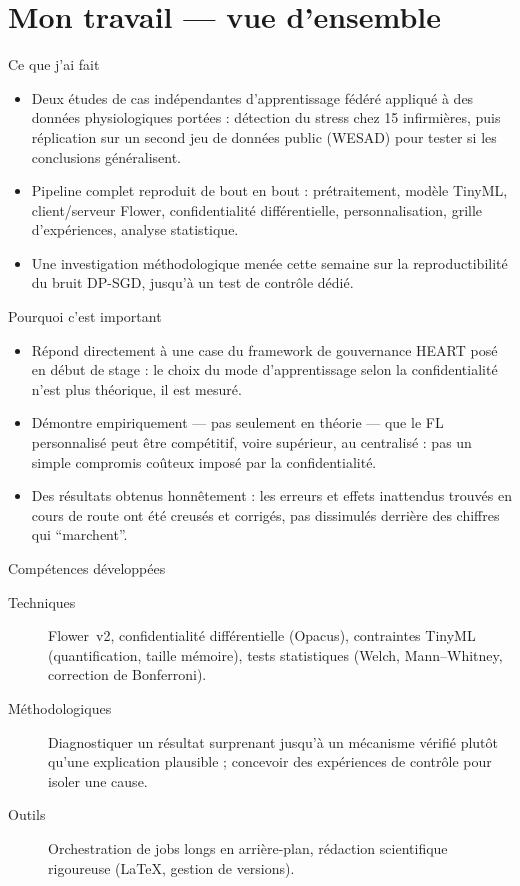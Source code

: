 \documentclass[aspectratio=169,11pt]{beamer}
\begin{document}
\section{Mon travail --- vue d'ensemble}

\begin{frame}{Ce que j'ai fait}
  \begin{itemize}
    \item Deux études de cas indépendantes d'apprentissage fédéré appliqué à
      des données physiologiques portées : détection du stress chez 15
      infirmières, puis réplication sur un second jeu de données public
      (WESAD) pour tester si les conclusions généralisent.
    \item Pipeline complet reproduit de bout en bout : prétraitement,
      modèle TinyML, client/serveur Flower, confidentialité différentielle,
      personnalisation, grille d'expériences, analyse statistique.
    \item Une investigation méthodologique menée cette semaine sur la
      reproductibilité du bruit DP-SGD, jusqu'à un test de contrôle dédié.
  \end{itemize}
\end{frame}

\begin{frame}{Pourquoi c'est important}
  \begin{itemize}
    \item Répond directement à une case du framework de gouvernance HEART
      posé en début de stage : le choix du mode d'apprentissage selon la
      confidentialité n'est plus théorique, il est mesuré.
    \item Démontre empiriquement --- pas seulement en théorie --- que le FL
      personnalisé peut être compétitif, voire supérieur, au centralisé :
      pas un simple compromis coûteux imposé par la confidentialité.
    \item Des résultats obtenus honnêtement : les erreurs et effets
      inattendus trouvés en cours de route ont été creusés et corrigés,
      pas dissimulés derrière des chiffres qui ``marchent''.
  \end{itemize}
\end{frame}

\begin{frame}{Compétences développées}
  \small
  \begin{description}
    \item[Techniques] Flower~v2, confidentialité différentielle (Opacus),
      contraintes TinyML (quantification, taille mémoire), tests
      statistiques (Welch, Mann--Whitney, correction de Bonferroni).
    \item[Méthodologiques] Diagnostiquer un résultat surprenant jusqu'à un
      mécanisme vérifié plutôt qu'une explication plausible ; concevoir des
      expériences de contrôle pour isoler une cause.
    \item[Outils] Orchestration de jobs longs en arrière-plan, rédaction
      scientifique rigoureuse (LaTeX, gestion de versions).
  \end{description}
\end{frame}
\end{document}
